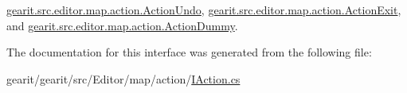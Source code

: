 \hyperlink{classgearit_1_1src_1_1editor_1_1map_1_1action_1_1_action_undo_a984f4a99ee6b115f89855be5fece8f91}{gearit.\+src.\+editor.\+map.\+action.\+Action\+Undo}, \hyperlink{classgearit_1_1src_1_1editor_1_1map_1_1action_1_1_action_exit_a07bdb0cfe693da28fdc056519e5a9f14}{gearit.\+src.\+editor.\+map.\+action.\+Action\+Exit}, and \hyperlink{classgearit_1_1src_1_1editor_1_1map_1_1action_1_1_action_dummy_aa4c1e91ae3f0a92e7ab82c9570559f6e}{gearit.\+src.\+editor.\+map.\+action.\+Action\+Dummy}.



The documentation for this interface was generated from the following file\+:\begin{DoxyCompactItemize}
\item 
gearit/gearit/src/\+Editor/map/action/\hyperlink{map_2action_2_i_action_8cs}{I\+Action.\+cs}\end{DoxyCompactItemize}
